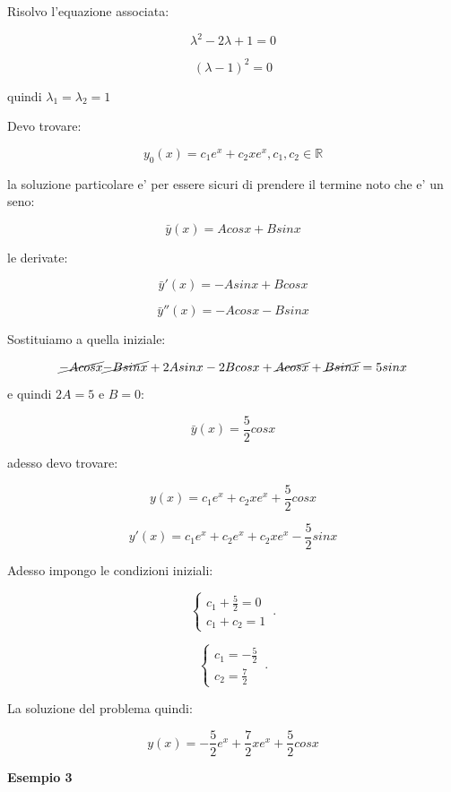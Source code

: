\documentclass[11pt]{article}
\begin{document}
Risolvo l'equazione associata:

\[
    \lambda^{2}-2 \lambda + 1=0
\]

\[
    (\lambda-1)^{2}=0
\]

quindi $\lambda_1=\lambda_2=1$


Devo trovare:

\[
    y_0(x) = c_1 e ^{x} + c_2 x e ^{x},c_1,c_2 \in \mathbb{R}
\]

la soluzione particolare e' per essere sicuri di prendere il termine noto che e' un seno:

\[
    \bar{y} (x) = A cosx + B sinx
\]

le derivate:

\[
    \bar{y} '(x)  = -A sinx + B cosx
\]

\[
    \bar{y} ''(x)  = -A cosx - B sinx
\]
    

Sostituiamo a quella iniziale:

\[
    \cancel{-A cosx} \cancel{- Bsinx} + 2A sinx - 2B cosx+ \cancel{A cosx} + \cancel{Bsinx} = 5sinx
\]

e quindi $2A = 5$ e $B=0$:

\[
    \bar{y} (x) = \frac{5}{2} cosx
\]

adesso devo trovare:

\[
    y(x) = c_1 e ^{x}+ c_2 x e ^{x} + \frac{5}{2} cosx
\]

\[
    y'(x)  = c_1 e ^{x} + c_2 e ^{x} + c_2x e ^{x} - \frac{5}{2}sinx
\]

Adesso impongo le condizioni iniziali:

    \begin{equation}
        \begin{cases}
            c_1 +\frac{5}{2}=0\\
            c_1+c_2= 1
        \end{cases}\,.
    \end{equation}

    \begin{equation}
        \begin{cases}
            c_1 = -\frac{5}{2}\\
            c_2 = \frac{7}{2}
        \end{cases}\,.
    \end{equation}

La soluzione del problema quindi:

\[
    y(x) = -\frac{5}{2}e ^{x}+ \frac{7}{2} x e ^{x} + \frac{5}{2} cosx
\]

\textbf{Esempio 3} 
\end{document}

